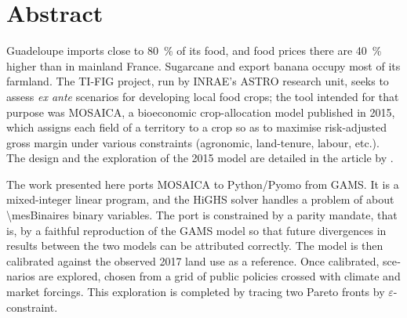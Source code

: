 \chapter*{Abstract}


\begin{otherlanguage}{english}

Guadeloupe imports close to \SI{80}{\percent} of its food, and food prices there are
\SI{40}{\percent} higher than in mainland France. Sugarcane and export banana occupy most of its
farmland. The TI-FIG project, run by INRAE's ASTRO research unit, seeks to assess \emph{ex ante}
scenarios for developing local food crops; the tool intended for that purpose was MOSAICA, a
bioeconomic crop-allocation model published in 2015, which assigns each field of a territory to a
crop so as to maximise risk-adjusted gross margin under various constraints (agronomic,
land-tenure, labour, etc.). The design and the exploration of the 2015 model are detailed in the
article by \parencite{chopin2015}.

The work presented here ports MOSAICA to Python/Pyomo from GAMS. It is a mixed-integer linear
program, and the HiGHS solver handles a problem of about \num{\mesBinaires} binary variables. The
port is constrained by a parity mandate, that is, by a faithful reproduction of the GAMS model so
that future divergences in results between the two models can be attributed correctly. The model
is then calibrated against the observed 2017 land use as a reference. Once calibrated, scenarios
are explored, chosen from a grid of public policies crossed with climate and market forcings. This
exploration is completed by tracing two Pareto fronts by $\varepsilon$-constraint.


\end{otherlanguage}
